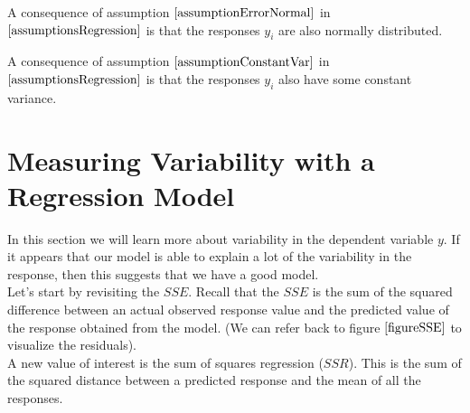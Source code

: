 \begin{nt}
A consequence of assumption $\ref{assumptionErrorNormal}$ in $\ref{assumptionsRegression}$
is that the responses $y_{i}$ are also normally distributed.
\end{nt}

\begin{nt}
A consequence of assumption $\ref{assumptionConstantVar}$ in $\ref{assumptionsRegression}$
is that the responses $y_{i}$ also have some constant variance.
\end{nt}












\section{Measuring Variability with a Regression Model}
\label{sectionVariabilityRegression}

In this section we will learn more about variability in the dependent variable $y$.
If it appears that our model is able to explain a lot of the variability in the response,
then this suggests that we have a good model.\\


Let's start by revisiting the $SSE$.
Recall that the $SSE$ is the sum of the squared difference between 
an actual observed response value and 
the predicted value of the response obtained from the model.
(We can refer back to figure $\ref{figureSSE}$ to 
visualize the residuals).\\

A new value of interest is the sum of squares regression ($SSR$).
This is the sum of the squared distance between a predicted response
and the mean of all the responses.

